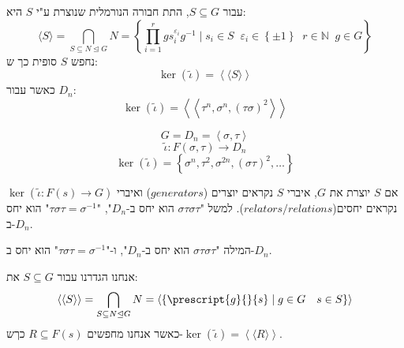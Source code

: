 \documentclass{tstextbook}
\begin{document}
\begin{definition}
עבור \(S\subseteq G\), התת חבורה הנורמלית שנוצרת ע"י \(S\) היא:
$$\langle S\rangle = \bigcap_{S\subseteq N\trianglelefteq G} N=\left\{  \prod_{i=1}^r gs_{i}^{\varepsilon_{i}}g^{-1} \mid s_{i}\in S\;\;\varepsilon_{i}\in \left\{  \pm 1  \right\}\;\;r\in \mathbb{N} \;\;g\in G  \right\}$$
נחפש \(S\) סופית כך ש:
$$\ker\left( \tilde{\iota} \right) = \left\langle  \langle S\rangle  \right\rangle$$
כאשר עבור \(D_{n}\):
$$\ker\left( \tilde{\iota} \right)=\left\langle  \left\langle  \tau^n, \sigma^n , \left( \tau \sigma \right)^2\right\rangle  \right\rangle$$

\end{definition}
\begin{example}
$$G=D_{n}=\left\langle  \sigma,\tau \right\rangle$$$$\tilde{\iota}:F\left( \sigma,\tau \right)\to D_{n}$$$$\ker\left( \tilde{\iota} \right)=\left\{  \sigma^n,\tau^2, \sigma^{2n}, \left( \sigma \tau \right)^2,\dots  \right\}$$

\end{example}
\begin{definition}
אם \(S\) יוצרת את \(G\), איברי \(S\) נקראים יוצרים (\(generators\)) ואיברי \(\ker\left( \tilde{\iota}:F(s)\to G \right)\) נקראים יחסים(\(relators / relations\)). למשל "\(\sigma \tau \sigma \tau\) הוא יחס ב-\(D_{n}\)", "\(\tau \sigma \tau=\sigma ^{-1}\)" הוא יחס ב-\(D_{n}\).

\end{definition}
\begin{example}
המילה "\(\sigma \tau \sigma \tau\) הוא יחס ב-\(D_{n}\)", ו-"\(\tau \sigma \tau=\sigma ^{-1}\)" הוא יחס ב-\(D_{n}\).

\end{example}
אנחנו הגדרנו עבור \(S\subseteq G\) את:
$$\left\langle  \langle S\rangle  \right\rangle =\bigcap_{S\subseteq N\trianglelefteq G}N=\left\langle  \left\{  \prescript{g}{}{s}\mid g\in G\quad s \in S  \right\} \right\rangle$$
כאשר אנחנו מחפשים \(R\subseteq F(s)\) כךש-\(\ker\left( \tilde{\iota} \right)= \left\langle \langle R\rangle\right\rangle\).
\end{document}
